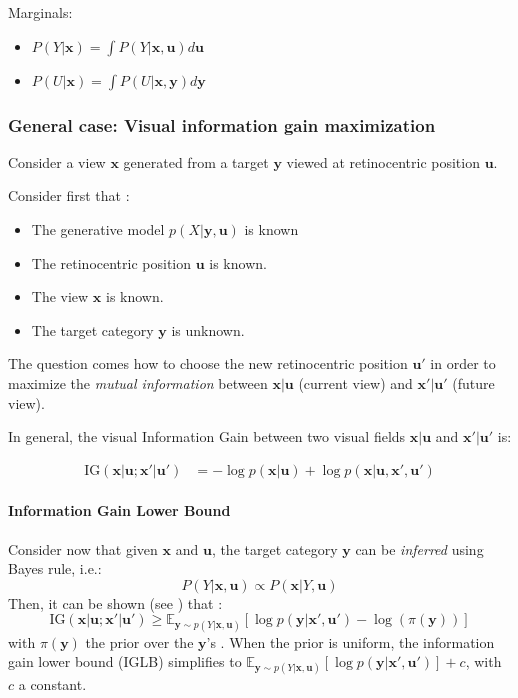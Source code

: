 Marginals:
\begin{itemize}
\item $ P(Y|\boldsymbol{x}) = \int P(Y|\boldsymbol{x}, \boldsymbol{u}) d\boldsymbol{u}$
\item $ P(U|\boldsymbol{x}) = \int P(U|\boldsymbol{x}, \boldsymbol{y}) d\boldsymbol{y}$
\end{itemize}


\subsubsection{General case: Visual information gain maximization}\label{sec:case1}

Consider a view $\boldsymbol{x}$ generated from a target $\boldsymbol{y}$ viewed at retinocentric position $\boldsymbol{u}$. 

Consider first that :
\begin{itemize}
	\item The generative model  $p(X|\boldsymbol{y}, \boldsymbol{u})$ is known
	\item The retinocentric position  $\boldsymbol{u}$ is known.
	\item The view $\boldsymbol{x}$ is known.
	\item The target category  $\boldsymbol{y}$ is unknown.
\end{itemize} 



The question comes how to choose the new retinocentric position $\boldsymbol{u}'$ in order to maximize the \emph{mutual information} between $\boldsymbol{x}|\boldsymbol{u}$ (current view) and $\boldsymbol{x}'|\boldsymbol{u}'$ (future view).

In general, the visual Information Gain between two visual fields $\boldsymbol{x}|\boldsymbol{u}$  and $\boldsymbol{x}'|\boldsymbol{u}'$ is:

\begin{align*}
\text{IG}(\boldsymbol{x}|\boldsymbol{u}; \boldsymbol{x}'| \boldsymbol{u}') 
&= -\log p(\boldsymbol{x}|\boldsymbol{u}) 
+ \log p(\boldsymbol{x}|\boldsymbol{u}, \boldsymbol{x}', \boldsymbol{u}')
\end{align*}

\paragraph{Information Gain Lower Bound}
Consider now that given  $\boldsymbol{x}$ and $\boldsymbol{u}$, the target category  $\boldsymbol{y}$ can be \emph{inferred} using Bayes rule, i.e.:
$$ P(Y|\boldsymbol{x}, \boldsymbol{u}) \propto  P(\boldsymbol{x}|Y, \boldsymbol{u}) $$
Then, it can be shown (see \cite{dauce2018}) that :
$$\text{IG}(\boldsymbol{x}|\boldsymbol{u}; \boldsymbol{x}'| \boldsymbol{u}') \geq \mathbb{E}_{\boldsymbol{y}\sim p(Y|\boldsymbol{x}, \boldsymbol{u})} \left[\log p(\boldsymbol{y}|\boldsymbol{x}', \boldsymbol{u}') - \log(\pi(\boldsymbol{y})) \right]$$
with  $\pi(\boldsymbol{y})$ the prior over the $\boldsymbol{y}$'s .
When the prior is uniform, the information gain lower bound (IGLB) simplifies to $\mathbb{E}_{\boldsymbol{y}\sim p(Y|\boldsymbol{x}, \boldsymbol{u})} \left[\log p(\boldsymbol{y}|\boldsymbol{x}', \boldsymbol{u}')\right] + c$, with $c$ a constant.

